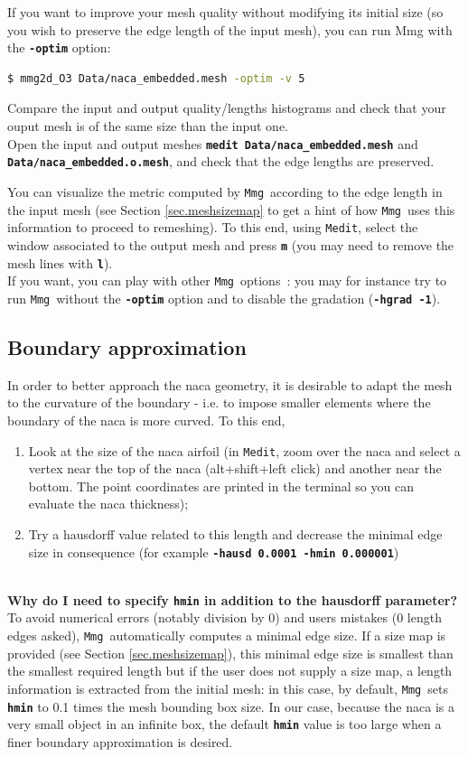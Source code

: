 \documentclass{article}
\newcommand{\ttb}[1]{\texttt{\textbf{#1}}}
\newcommand{\mmg}{\texttt{Mmg}}
\newcommand{\medit}{\texttt{Medit}}
\begin{document}
 If you want to improve your mesh quality without modifying its
 initial size (so you wish to preserve the edge length of the input
 mesh), you can run Mmg with the \ttb{-optim} option:
\begin{lstlisting}[language=bash]
$ mmg2d_O3 Data/naca_embedded.mesh -optim -v 5
\end{lstlisting}
Compare the input and output quality/lengths histograms and check that
your ouput mesh is of the same size than the input one.\\

Open the input and output meshes \ttb{medit Data/naca\_embedded.mesh} and 
  \ttb{Data/naca\_embedded.o.mesh}, and check that the edge lengths are
preserved. 

You can visualize the metric computed by \mmg\ according to the edge length in the input mesh (see Section \ref{sec.meshsizemap} to get a hint of how \mmg\ uses this information to proceed to remeshing). 
To this end, using \medit, select the window associated to the output mesh and press \ttb{m} (you may need to
remove the mesh lines with \ttb{l}).\\

If you want, you can play with other \mmg\ options~: you may for instance try
to run \mmg\ without the \ttb{-optim} option and to disable the gradation
(\ttb{-hgrad -1}).

\subsection{Boundary approximation}\label{sec.hausd}
In order to better approach the naca geometry, it is desirable to adapt the mesh to the curvature of the boundary - i.e. to impose smaller elements where the boundary of the naca is more curved.
To this end,
\begin{enumerate}
\item Look at the size of the naca airfoil (in \medit, zoom over the
naca and select a vertex near the top of the naca (alt+shift+left
click) and another near the bottom. The point coordinates are printed
in the terminal so you can evaluate the naca thickness);
\item Try a hausdorff value related to this length and decrease the minimal edge
size in consequence (for example \ttb{-hausd 0.0001 -hmin 0.000001})
\end{enumerate}

\textbf{\\Why do I need to specify \ttb{hmin} in addition to the hausdorff parameter?\\}
To avoid numerical errors (notably division by 0) and users mistakes (0 length
edges asked), \mmg\ automatically computes a minimal edge size. If a
size map is provided (see Section \ref{sec.meshsizemap}), this minimal edge size is smallest than the
smallest required length but if the user does not supply a size map, a length information is extracted from the initial mesh: in this case,
by default, \mmg\ sets \ttb{hmin} to 0.1 times the mesh bounding box
size. In our case, because the naca is a very small object in an
infinite box, the default \ttb{hmin} value is too large when a finer boundary approximation is desired.
\end{document}
